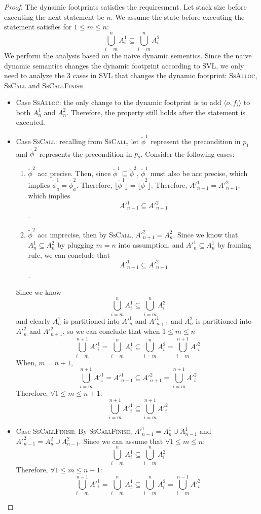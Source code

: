 \documentclass {article}
\newcommand{\tphi}{\widetilde{\phi}}
\begin{document}
\begin{proof}
The dynamic footprints satisfies the requiresment. Let stack size before executing the next statement be $n$. We assume the state before executing the statement satisfies for $1 \leq m \leq n$: $$\bigcup_{i = m}^n A^1_i \subseteq \bigcup_{i=m}^n A^2_i$$
We perform the analysis based on the naive dynamic sementics. Since the naive dynamic semantics changes the dynamic footprint according to SVL, we only need to analyze the 3 cases in SVL that changes the dynamic footprint: \textsc{SsAlloc}, \textsc{SsCall} and \textsc{SsCallFinish}
	\begin{itemize}
		\item Case \textsc{SsAlloc}: the only change to the dynamic footprint is to add $\langle o, f_i \rangle$ to both $A^1_n$ and $A^2_n$. Therefore, the property still holds after the statement is executed.
		\item Case \textsc{SsCall}: recalling from \textsc{SsCall}, let $\tphi^1$ represent the precondition in $p_1$ and $\tphi^2$ represents the precondition in $p_2$. Consider the following cases: 
		\begin{enumerate}
			\item $\tphi^2$ acc precise. Then, since $\tphi^1 \sqsubseteq \tphi^2$, $\tphi^1$ must also be acc precise, which implies $\tphi_a^1 = \tphi_a^2$. Therefore, $\lfloor \tphi^1 \rfloor = \lfloor \tphi^2 \rfloor$. Therefore, $A'^1_{n+1} = A'^2_{n+1}$, which implies $$A'^1_{n+1} \subseteq A'^2_{n+1}$$. 
			\item $\tphi^2$ acc imprecise, then by \textsc{SsCall}, $A'^2_{n+1} = A^2_n$. Since we know that $A^1_n \subseteq A^2_n$ by plugging $m = n$ into assumption, and $A'^1_n \subseteq A^1_n$ by framing rule, we can conclude that $$A'^1_{n+1} \subseteq A'^2_{n+1}$$.
		\end{enumerate}
Since we know $$\bigcup_{i = m}^n A^1_i \subseteq \bigcup_{i=m}^n A^2_i$$ and clearly $A^1_n$ is partitioned into $A'^1_n$ and $A'^1_{n+1}$ and $A^2_n$ is partitioned into $A'^2_n$ and $A'^2_{n+1}$, so we can conclude that when $ 1 \leq m \leq n$
$$\bigcup_{i = m}^{n+1} A'^1_i = \bigcup_{i = m}^n A^1_i \subseteq \bigcup_{i=m}^n A^2_i = \bigcup_{i = m}^{n+1} A'^2_i$$
When, $m = n + 1$, $$\bigcup_{i = m}^{n+1} A'^1_i = A'^1_{n+1} \subseteq A'^2_{n+1} = \bigcup_{i = m}^{n+1} A'^2_i$$ Therefore, $\forall 1 \leq m \leq n+1$:
$$\bigcup_{i = m}^{n+1} A'^1_i  \subseteq \bigcup_{i = m}^{n+1} A'^2_i$$
		\item Case \textsc{SsCallFinish}: By \textsc{SsCallFinish}, $A'^1_{n-1} = A^1_{n} \cup A^1_{n-1}$ and $A'^2_{n-1} = A^2_{n} \cup A^2_{n - 1}$. Since we can assume that $\forall 1 \leq m \leq n$: $$\bigcup_{i = m}^n A^1_i \subseteq \bigcup_{i=m}^n A^2_i$$ Therefore, $\forall 1 \leq m \leq n-1$: $$\bigcup_{i = m}^{n - 1} A'^1_i =\bigcup_{i = m}^{n} A^1_i \subseteq \bigcup_{i = m}^{n} A^2_i  = \bigcup_{i=m}^{n - 1} A'^2_i$$
\end{itemize}
\end{proof}
\end{document}
